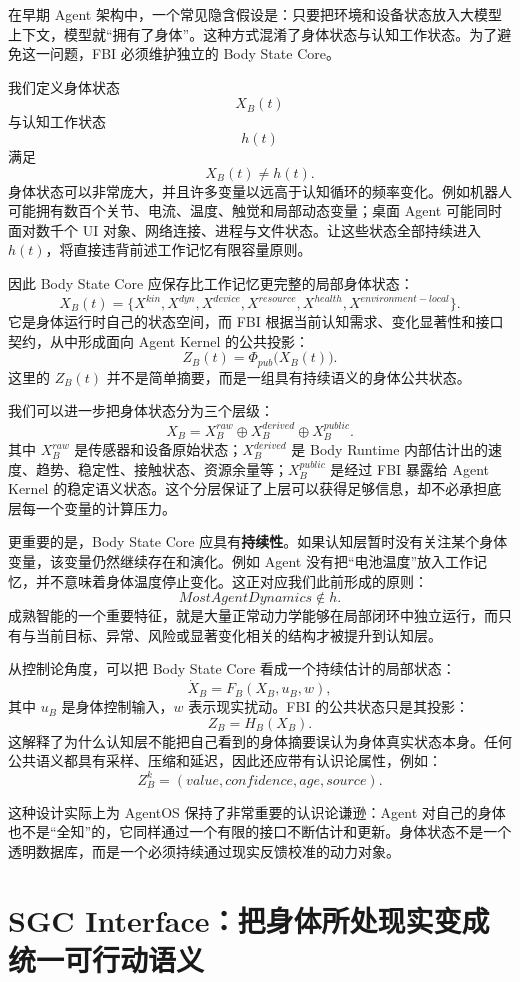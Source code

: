 在早期 Agent 架构中，一个常见隐含假设是：只要把环境和设备状态放入大模型上下文，模型就“拥有了身体”。这种方式混淆了身体状态与认知工作状态。为了避免这一问题，FBI 必须维护独立的 Body State Core。

我们定义身体状态
\[
X_B(t)
\]
与认知工作状态
\[
h(t)
\]
满足
\[
\boxed{
X_B(t)\neq h(t).
}
\]
身体状态可以非常庞大，并且许多变量以远高于认知循环的频率变化。例如机器人可能拥有数百个关节、电流、温度、触觉和局部动态变量；桌面 Agent 可能同时面对数千个 UI 对象、网络连接、进程与文件状态。让这些状态全部持续进入 \(h(t)\)，将直接违背前述工作记忆有限容量原则。

因此 Body State Core 应保存比工作记忆更完整的局部身体状态：
\[
X_B(t)
=
\{
X^{kin},
X^{dyn},
X^{device},
X^{resource},
X^{health},
X^{environment-local}
\}.
\]
它是身体运行时自己的状态空间，而 FBI 根据当前认知需求、变化显著性和接口契约，从中形成面向 Agent Kernel 的公共投影：
\[
Z_B(t)
=
\Phi_{pub}
\bigl(
X_B(t)
\bigr).
\]
这里的 \(Z_B(t)\) 并不是简单摘要，而是一组具有持续语义的身体公共状态。

我们可以进一步把身体状态分为三个层级：
\[
X_B
=
X_B^{raw}
\oplus
X_B^{derived}
\oplus
X_B^{public}.
\]
其中 \(X_B^{raw}\) 是传感器和设备原始状态；\(X_B^{derived}\) 是 Body Runtime 内部估计出的速度、趋势、稳定性、接触状态、资源余量等；\(X_B^{public}\) 是经过 FBI 暴露给 Agent Kernel 的稳定语义状态。这个分层保证了上层可以获得足够信息，却不必承担底层每一个变量的计算压力。

更重要的是，Body State Core 应具有\textbf{持续性}。如果认知层暂时没有关注某个身体变量，该变量仍然继续存在和演化。例如 Agent 没有把“电池温度”放入工作记忆，并不意味着身体温度停止变化。这正对应我们此前形成的原则：
\[
\boxed{
MostAgentDynamics\notin h.
}
\]
成熟智能的一个重要特征，就是大量正常动力学能够在局部闭环中独立运行，而只有与当前目标、异常、风险或显著变化相关的结构才被提升到认知层。

从控制论角度，可以把 Body State Core 看成一个持续估计的局部状态：
\[
\dot X_B
=
F_B(X_B,u_B,w),
\]
其中 \(u_B\) 是身体控制输入，\(w\) 表示现实扰动。FBI 的公共状态只是其投影：
\[
Z_B
=
H_B(X_B).
\]
这解释了为什么认知层不能把自己看到的身体摘要误认为身体真实状态本身。任何公共语义都具有采样、压缩和延迟，因此还应带有认识论属性，例如：
\[
Z_B^k
=
(
value,
confidence,
age,
source
).
\]

这种设计实际上为 AgentOS 保持了非常重要的认识论谦逊：Agent 对自己的身体也不是“全知”的，它同样通过一个有限的接口不断估计和更新。身体状态不是一个透明数据库，而是一个必须持续通过现实反馈校准的动力对象。


\section{SGC Interface：把身体所处现实变成统一可行动语义}

